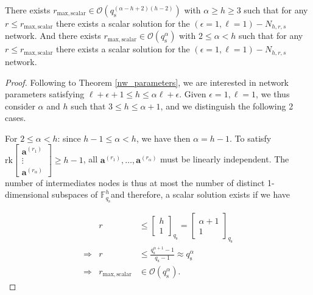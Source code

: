 \begin{thm}
There exists $r_{\mathrm{max,scalar}}\in\mathcal{O}\left(q_{\mathrm{s}}^{\left(\alpha-h+2\right)\left(h-2\right)}\right)$
with $\alpha\geq h\geq3$ such that for any $r\leq r_{\mathrm{max,scalar}}$
there exists a scalar solution for the $\left(\epsilon=1,\ell=1\right)-\ensuremath{N}_{h,r,s}$
network. And there exists $r_{\mathrm{max,scalar}}\in\mathcal{O}\left(q_{\mathrm{s}}^{\alpha}\right)$
with $2\leq\alpha<h$ such that for any $r\leq r_{\mathrm{max,scalar}}$
there exists a scalar solution for the $\left(\epsilon=1,\ell=1\right)-\ensuremath{N}_{h,r,s}$
network. \label{theo:r_scalar_e1l1}
\end{thm}
\begin{proof}
Following to Theorem \ref{nw_parameters}, we are interested in network
parameters satisfying $\ell+\epsilon+1\leq h\leq\alpha\ell+\epsilon$.
Given $\epsilon=1,\ell=1$, we thus consider $\alpha$ and $h$ such
that $3\leq h\leq\alpha+1$, and we distinguish the following 2 cases.

For $2\leq\alpha<h$: since $h-1\leq\alpha<h$, we have then $\alpha=h-1$.
To satisfy $\mathrm{rk}\left[\begin{array}{c}
\boldsymbol{a}^{\left(r_{1}\right)}\\
\vdots\\
\boldsymbol{a}^{\left(r_{\alpha}\right)}
\end{array}\right]\geq h-1$, all $\boldsymbol{a}^{\left(r_{1}\right)},\ldots,\boldsymbol{a}^{\left(r_{\alpha}\right)}$
must be linearly independent. The number of intermediates nodes is
thus at most the number of distinct 1-dimensional subspaces of $\ensuremath{\mathbb{F}}_{q_{\mathrm{s}}}^{h}$and
therefore, a scalar solution exists if we have

\begin{eqnarray*}
 & r & \leq\left[\begin{array}{c}
h\\
1
\end{array}\right]_{q_{\mathrm{s}}}=\left[\begin{array}{c}
\alpha+1\\
1
\end{array}\right]_{q_{\mathrm{s}}}\\
\Rightarrow & r & \leq\frac{q_{\mathrm{s}}^{\alpha+1}-1}{q_{\mathrm{s}}-1}\approx q_{\mathrm{s}}^{\alpha}\\
\Rightarrow & r_{\mathrm{max,scalar}} & \in\mathcal{O}\left(q_{\mathrm{s}}^{\alpha}\right).
\end{eqnarray*}


\end{proof}
